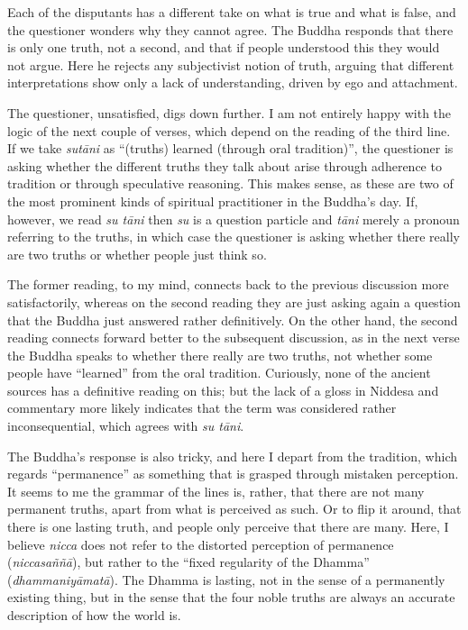 \documentclass[12pt,openany]{book}%
\begin{document}
Each of the disputants has a different take on what is true and what is false, and the questioner wonders why they cannot agree. The Buddha responds that there is only one truth, not a second, and that if people understood this they would not argue. Here he rejects any subjectivist notion of truth, arguing that different interpretations show only a lack of understanding, driven by ego and attachment.

The questioner, unsatisfied, digs down further. I am not entirely happy with the logic of the next couple of verses, which depend on the reading of the third line. If we take \textit{\textsanskrit{sutāni}} as “(truths) learned (through oral tradition)”, the questioner is asking whether the different truths they talk about arise through adherence to tradition or through speculative reasoning. This makes sense, as these are two of the most prominent kinds of spiritual practitioner in the Buddha’s day. If, however, we read \textit{su \textsanskrit{tāni}} then \textit{su} is a question particle and \textit{\textsanskrit{tāni}} merely a pronoun referring to the truths, in which case the questioner is asking whether there really are two truths or whether people just think so.

The former reading, to my mind, connects back to the previous discussion more satisfactorily, whereas on the second reading they are just asking again a question that the Buddha just answered rather definitively. On the other hand, the second reading connects forward better to the subsequent discussion, as in the next verse the Buddha speaks to whether there really are two truths, not whether some people have “learned” from the oral tradition. Curiously, none of the ancient sources has a definitive reading on this; but the lack of a gloss in Niddesa and commentary more likely indicates that the term was considered rather inconsequential, which agrees with \textit{su \textsanskrit{tāni}}.

The Buddha’s response is also tricky, and here I depart from the tradition, which regards “permanence” as something that is grasped through mistaken perception. It seems to me the grammar of the lines is, rather, that there are not many permanent truths, apart from what is perceived as such. Or to flip it around, that there is one lasting truth, and people only perceive that there are many. Here, I believe \textit{nicca} does not refer to the distorted perception of permanence (\textit{\textsanskrit{niccasaññā}}), but rather to the “fixed regularity of the Dhamma” (\textit{\textsanskrit{dhammaniyāmatā}}). The Dhamma is lasting, not in the sense of a permanently existing thing, but in the sense that the four noble truths are always an accurate description of how the world is.
\end{document}
